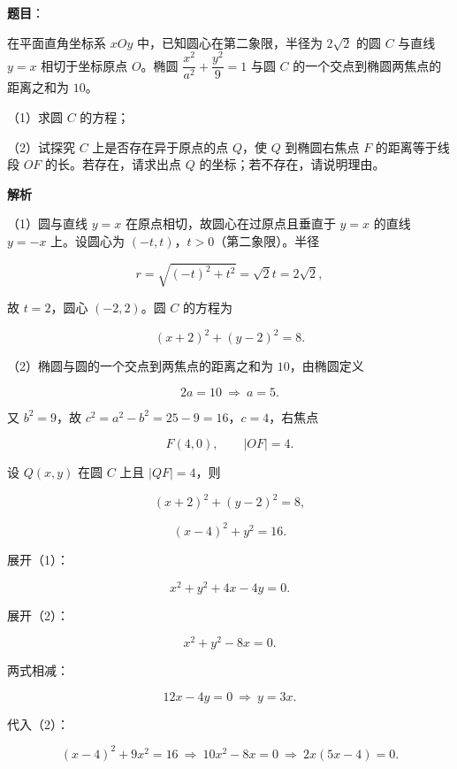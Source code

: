 \begin{answer}

\textbf{题目}：

在平面直角坐标系 $xOy$ 中，已知圆心在第二象限，半径为 $2\sqrt2$ 的圆 $C$ 与直线 $y=x$ 相切于坐标原点 $O$。椭圆 $\dfrac{x^2}{a^2}+\dfrac{y^2}{9}=1$ 与圆 $C$ 的一个交点到椭圆两焦点的距离之和为 $10$。

（1）求圆 $C$ 的方程；

（2）试探究 $C$ 上是否存在异于原点的点 $Q$，使 $Q$ 到椭圆右焦点 $F$ 的距离等于线段 $OF$ 的长。若存在，请求出点 $Q$ 的坐标；若不存在，请说明理由。

\textbf{解析}

（1）圆与直线 $y=x$ 在原点相切，故圆心在过原点且垂直于 $y=x$ 的直线 $y=-x$ 上。设圆心为 $(-t,t)$，$t>0$（第二象限）。半径

\nopagebreak[4]
\[r=\sqrt{(-t)^2+t^2}=\sqrt2t=2\sqrt2,\]

故 $t=2$，圆心 $(-2,2)$。圆 $C$ 的方程为

\nopagebreak[4]
\[(x+2)^2+(y-2)^2=8.\]

（2）椭圆与圆的一个交点到两焦点的距离之和为 $10$，由椭圆定义

\nopagebreak[4]
\[2a=10\ \Rightarrow\ a=5.\]

又 $b^2=9$，故 $c^2=a^2-b^2=25-9=16$，$c=4$，右焦点

\nopagebreak[4]
\[F(4,0),\qquad |OF|=4.\]

设 $Q(x,y)$ 在圆 $C$ 上且 $|QF|=4$，则

\nopagebreak[4]
\[(x+2)^2+(y-2)^2=8,\tag{1}\]

\nopagebreak[4]
\[(x-4)^2+y^2=16.\tag{2}\]

展开（1）：

\nopagebreak[4]
\[x^2+y^2+4x-4y=0.\]

展开（2）：

\nopagebreak[4]
\[x^2+y^2-8x=0.\]

两式相减：

\nopagebreak[4]
\[12x-4y=0\ \Rightarrow\ y=3x.\]

代入（2）：

\nopagebreak[4]
\[(x-4)^2+9x^2=16\ \Rightarrow\ 10x^2-8x=0\ \Rightarrow\ 2x(5x-4)=0.\]


\end{answer}
